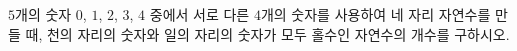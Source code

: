 $5$개의 숫자 $0$, $1$, $2$, $3$, $4$ 중에서 서로 다른 $4$개의 숫자를 사용하여 네 자리 자연수를 만들 때, 천의 자리의 숫자와 일의 자리의 숫자가 모두 홀수인 자연수의 개수를 구하시오.

